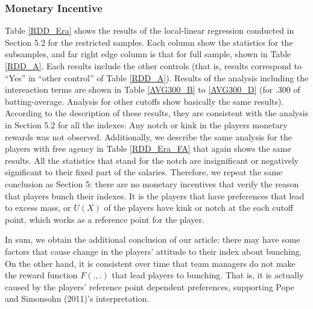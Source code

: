 \documentclass[dvipdfmx, 12pt]{article}
\begin{document}
\subsubsection{Monetary Incentive}

Table \ref{RDD_Era} shows the results of the local-linear regression conducted in Section 5.2 for the restricted samples. Each column show the statistics for the subsamples, and far right edge column is that for full sample, shown in Table \ref{RDD_A}. Each results include the other controls (that is, results correspond to ``Yes'' in ``other control'' of Table \ref{RDD_A}). Results of the analysis including the intereaction terms are shown in Table \ref{AVG300_B} to \ref{AVG300_D} (for .300 of batting-average. Analysis for other cutoffs show basically the same results). According to the description of these results, they are consistent with the  analysis in Section 5.2 for all the indexes: Any notch or kink in the players monetary rewards was not observed. Additionally, we describe the same analysis for the players with free agency in Table \ref{RDD_Era_FA} that again shows the same results. All the statistics that stand for the notch are insignificant or negatively significant to their fixed part of the salaries. Therefore, we repeat the same conclusion as Section 5: there are no monetary incentives that verify the reason that players bunch their indexes. It is the players that have preferences that lead to excess mass, or $U(X)$ of the players have kink or notch at the each cutoff point, which works as a reference point for the player.

In sum, we obtain the additional conclusion of our article: there may have some factors that cause change in the players' attitude to their index about bunching. On the other hand, it is consistent over time that team managers do not make the reward function $F(.,.)$ that lead players to bunching. That is, it is actually caused by the players' reference point dependent preferences, supporting Pope and Simonsohn (2011)'s interpretation.
\end{document}
